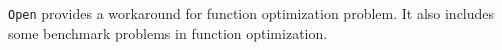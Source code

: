\texttt{Open} provides a workaround for function optimization problem.
It also includes some benchmark problems in function optimization. 
